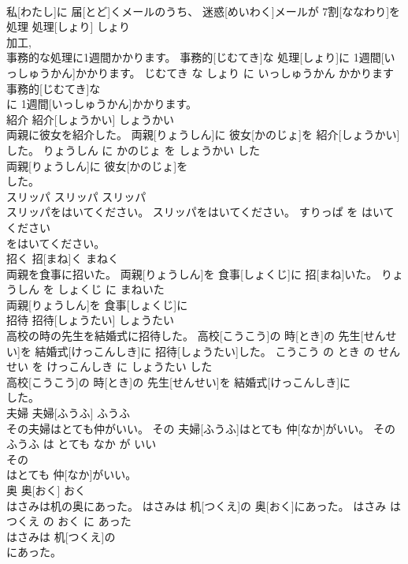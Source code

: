 \documentclass[8pt]{extreport}
\begin{document}
\begin{CJK}{UTF8}{min}
\\	私[わたし]に 届[とど]くメールのうち、 迷惑[めいわく]メールが 7割[ななわり]を
\\	処理	処理[しょり]	しょり	
\\	加工, 
\\	事務的な処理に1週間かかります。	事務的[じむてき]な 処理[しょり]に 1週間[いっしゅうかん]かかります。	じむてき な しょり に いっしゅうかん かかります	
\\	事務的[じむてき]な
\\	に 1週間[いっしゅうかん]かかります。		
\\	紹介	紹介[しょうかい]	しょうかい	
\\	両親に彼女を紹介した。	両親[りょうしん]に 彼女[かのじょ]を 紹介[しょうかい]した。	りょうしん に かのじょ を しょうかい した	
\\	両親[りょうしん]に 彼女[かのじょ]を
\\	した。		
\\	スリッパ	スリッパ	スリッパ	
\\	スリッパをはいてください。	スリッパをはいてください。	すりっぱ を はいて ください	
\\	をはいてください。		
\\	招く	招[まね]く	まねく	
\\	両親を食事に招いた。	両親[りょうしん]を 食事[しょくじ]に 招[まね]いた。	りょうしん を しょくじ に まねいた	
\\	両親[りょうしん]を 食事[しょくじ]に
\\	招待	招待[しょうたい]	しょうたい	
\\	高校の時の先生を結婚式に招待した。	高校[こうこう]の 時[とき]の 先生[せんせい]を 結婚式[けっこんしき]に 招待[しょうたい]した。	こうこう の とき の せんせい を けっこんしき に しょうたい した	
\\	高校[こうこう]の 時[とき]の 先生[せんせい]を 結婚式[けっこんしき]に
\\	した。		
\\	夫婦	夫婦[ふうふ]	ふうふ	
\\	その夫婦はとても仲がいい。	その 夫婦[ふうふ]はとても 仲[なか]がいい。	その ふうふ は とても なか が いい	
\\	その
\\	はとても 仲[なか]がいい。		
\\	奥	奥[おく]	おく	
\\	はさみは机の奥にあった。	はさみは 机[つくえ]の 奥[おく]にあった。	はさみ は つくえ の おく に あった	
\\	はさみは 机[つくえ]の
\\	にあった。		

\end{CJK}
\end{document}
